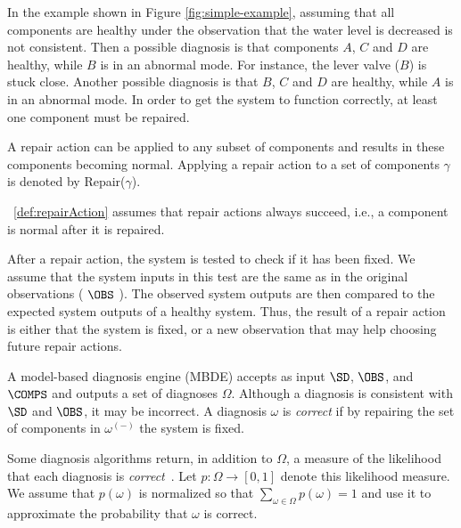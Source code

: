 In the example shown in Figure \ref{fig:simple-example}, assuming that all components are healthy under the observation that the water level is decreased is not consistent. Then a possible diagnosis is that components $A$, $C$ and $D$ are healthy, while $B$ is in an abnormal mode. For instance, the lever valve ($B$) is stuck close. 
Another possible diagnosis is that 
$B$, $C$ and $D$ are healthy, while $A$ is in an abnormal mode. In order to get the system to function correctly, at least one component must be repaired.

\begin{definition}
A repair action can be applied to any subset of components and results in these components becoming normal. Applying a repair action to a set of components $\gamma$ is denoted by Repair($\gamma$).
\label{def:repairAction}
\end{definition}
\noindent ~\ref{def:repairAction} assumes that repair actions always succeed, i.e., a component is normal after it is repaired. %

After a repair action, the system is tested to check if it has been fixed.
We assume that the system inputs in this test are the same as in the original observations ( $\OBS$ ). The observed system outputs are then compared to the expected system outputs of a healthy system. Thus, the result of a repair action is either that the system is fixed, or a new observation that may help choosing future repair actions.



A model-based diagnosis engine (MBDE) accepts as input $\SD$, $\OBS$, and $\COMPS$ and outputs a set of diagnoses $\Omega$. Although a diagnosis is consistent with $\SD$ and $\OBS$, it may be incorrect. A diagnosis $\omega$ is {\em correct} if by repairing the set of components in $\omega^{(-)}$ the system is fixed. 

Some diagnosis algorithms return, in addition to $\Omega$, a measure of the likelihood that each diagnosis is {\em correct}~\cite{williams2007conflict,abreu2011simultaneousDebugging,Stern15shely}. Let $p: \Omega \rightarrow [0,1]$ denote this likelihood measure. We assume that $p(\omega)$ is normalized so that $\sum_{\omega\in\Omega} p(\omega)=1$ and use it to approximate the probability that $\omega$ is correct.


